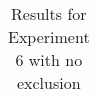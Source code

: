 \documentclass[
  11pt          %
  ,letterpaper  %
  ,center       %
  ,noupper      %
  ]{uconnthesis2}
\begin{document}
\begin{table}[htb!]
{\begin{tabular}{ | c | c | c | c | c | c |}
\end{tabular}}
\caption{Results for Experiment 6 with no exclusion} \label{tab:ch3exp6a}
\end{table} 
\end{document}
